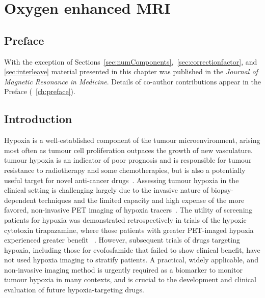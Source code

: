 
\chapter{Oxygen enhanced MRI}
\label{ch:oemri1}

\section{Preface}

With the exception of Sections~\ref{sec:numComponents},~\ref{sec:correctionfactor}, and \ref{sec:interleave} material presented in this chapter was published in the \textit{Journal of Magnetic Resonance in Medicine}.
Details of co-author contributions appear in the Preface (~\ref{ch:preface}).

\section{Introduction}

Hypoxia is a well-established component of the tumour microenvironment, arising most often as tumour cell proliferation outpaces the growth of new vasculature.
tumour hypoxia is an indicator of poor prognosis and is responsible for tumour resistance to radiotherapy and some chemotherapies, but is also a potentially useful target for novel anti-cancer drugs~\cite{Wilson:2011jp}.
Assessing tumour hypoxia in the clinical setting is challenging largely due to the invasive nature of biopsy-dependent techniques and the limited capacity and high expense of the more favored, non-invasive PET imaging of hypoxia tracers~\cite{Horsman:2012kw}.
The utility of screening patients for hypoxia was demonstrated retrospectively in trials of the hypoxic cytotoxin tirapazamine, where those patients with greater PET-imaged hypoxia experienced greater benefit ~\cite{Rischin:2006fz}.
However, subsequent trials of drugs targeting hypoxia, including those for evofosfamide that failed to show clinical benefit, have not used hypoxia imaging to stratify patients.
A practical, widely applicable, and non-invasive imaging method is urgently required as a biomarker to monitor tumour hypoxia in many contexts, and is crucial to the development and clinical evaluation of future hypoxia-targeting drugs.


